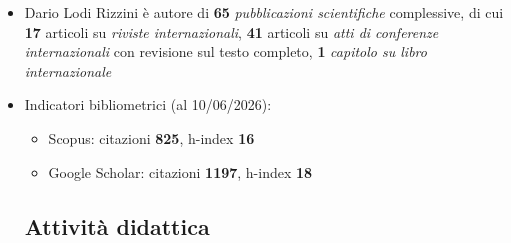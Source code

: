 \documentclass[11pt]{article}
\begin{document}
\begin{itemize}
\item Dario Lodi Rizzini \`e autore di \textbf{65} \emph{pubblicazioni scientifiche} complessive, di cui 
  \textbf{17} articoli su \emph{riviste internazionali}, 
  \textbf{41} articoli su \emph{atti di conferenze internazionali} con revisione sul testo completo,
  \textbf{1} \emph{capitolo su libro internazionale}

\item Indicatori bibliometrici (al 10/06/2026): 
  \begin{itemize}
  \item Scopus: citazioni \textbf{825}, h-index \textbf{16}
  \item Google Scholar: citazioni \textbf{1197}, h-index \textbf{18}
\end{itemize}





\subsection*{Attivit\`a didattica}


\end{itemize}
\end{document}
